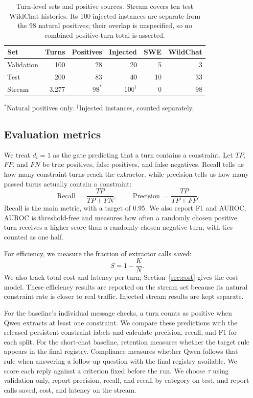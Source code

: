 \begin{table}[t]
\caption{Turn-level sets and positive sources. Stream covers ten test WildChat histories. Its 100 injected instances are separate from the 98 natural positives; their overlap is unspecified, so no combined positive-turn total is asserted.}
\label{tab:data}
\centering\small
\begin{tabular}{lrrrrr}
\toprule
Set & Turns & Positives & Injected & SWE & WildChat\\
\midrule
Validation & 100 & 28 & 20 & 5 & 3\\
Test & 200 & 83 & 40 & 10 & 33\\
Stream & 3,277 & $98^{*}$ & $100^{\dagger}$ & 0 & 98\\
\bottomrule
\end{tabular}
\par\smallskip\footnotesize $^{*}$Natural positives only. $^{\dagger}$Injected instances, counted separately.
\end{table}

\subsection{Evaluation metrics}
We treat $d_t=1$ as the gate predicting that a turn contains a constraint. Let $TP$, $FP$, and $FN$ be true positives, false positives, and false negatives. Recall tells us how many constraint turns reach the extractor, while precision tells us how many passed turns actually contain a constraint:
\begin{equation}
\operatorname{Recall}=\frac{TP}{TP+FN},\qquad
\operatorname{Precision}=\frac{TP}{TP+FP}.
\end{equation}
Recall is the main metric, with a target of 0.95. We also report F1 and AUROC. AUROC is threshold-free and measures how often a randomly chosen positive turn receives a higher score than a randomly chosen negative turn, with ties counted as one half.

For efficiency, we measure the fraction of extractor calls saved:
\begin{equation}
S=1-\frac{K}{N}.
\end{equation}
We also track total cost and latency per turn; Section~\ref{sec:cost} gives the cost model. These efficiency results are reported on the stream set because its natural constraint rate is closer to real traffic. Injected stream results are kept separate.

For the baseline's individual message checks, a turn counts as positive
when Qwen extracts at least one constraint. We compare these predictions
with the released persistent-constraint labels and calculate precision, recall,
and F1 for each split. For the short-chat baseline, retention measures
whether the target rule appears in the final registry. Compliance measures
whether Qwen follows that rule when answering a follow-up question with the
final registry available. We score each reply against a criterion fixed
before the run. We choose $\tau$ using validation only, report precision, recall, and recall by category on test, and report calls saved, cost, and latency on the stream.
